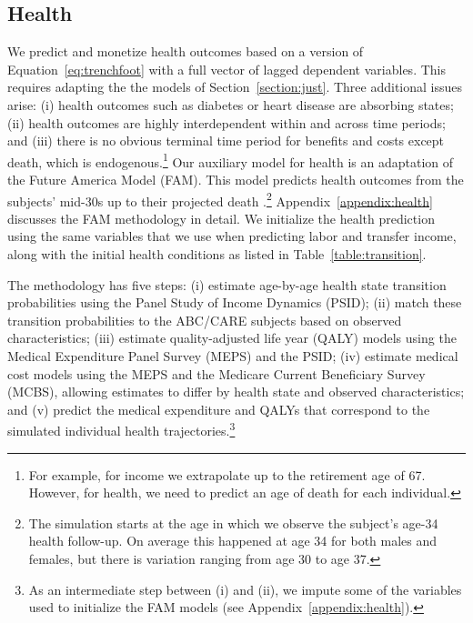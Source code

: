 \subsection{Health} \label{section:health}

 We predict and monetize health outcomes based on a version of Equation~\eqref{eq:trenchfoot} with a full vector of lagged dependent variables. This requires adapting the the models of Section~\ref{section:just}. Three additional issues arise: (i) health outcomes such as diabetes or heart disease are absorbing states; (ii) health outcomes are highly interdependent within and across time periods; and (iii) there is no obvious terminal time period for benefits and costs except death, which is endogenous.\footnote{For example, for income we extrapolate up to the retirement age of 67. However, for health, we need to predict an age of death for each individual.} Our auxiliary model for health is an adaptation of the Future America Model (FAM). This model predicts health outcomes from the subjects' mid-30s up to their projected death \citep{Goldman_etal_2015_Future-Elderly-Model-Report}.\footnote{The simulation starts at the age in which we observe the subject's age-34 health follow-up. On average this happened at age 34 for both males and females, but there is variation ranging from age 30 to age 37.} Appendix~\ref{appendix:health} discusses the FAM methodology in detail. We initialize the health prediction using the same variables that we use when predicting labor and transfer income, along with the initial health conditions as listed in Table~\ref{table:transition}.

The methodology has five steps: (i) estimate age-by-age health state transition probabilities using the Panel Study of Income Dynamics (PSID); (ii) match these transition probabilities to the ABC/CARE subjects based on observed characteristics; (iii) estimate quality-adjusted life year (QALY) models using the Medical Expenditure Panel Survey (MEPS) and the PSID; (iv) estimate medical cost models using the MEPS and the Medicare Current Beneficiary Survey (MCBS), allowing estimates to differ by health state and observed characteristics; and (v) predict the medical expenditure and QALYs that correspond to the simulated individual health trajectories.\footnote{As an intermediate step between (i) and (ii), we impute some of the variables used to initialize the FAM models (see Appendix~\ref{appendix:health}).}

